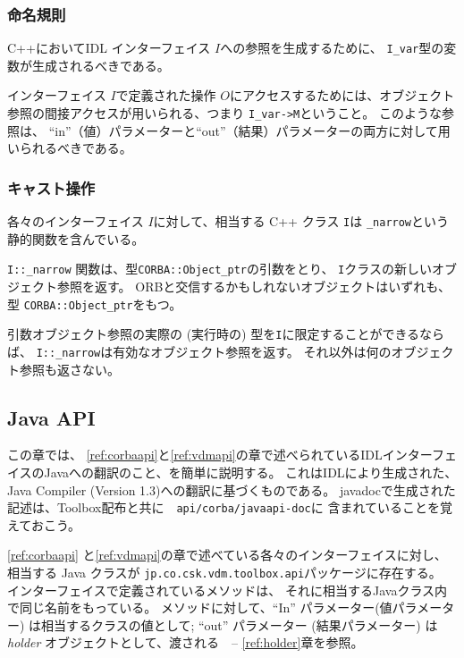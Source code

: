 \documentclass[\pformat,12pt]{jarticle}
\begin{document}
\subsubsection{命名規則}

C++においてIDL インターフェイス $I$への参照を生成するために、
 \texttt{I\_var}型の変数が生成されるべきである。

インターフェイス $I$で定義された操作 $O$にアクセスするためには、オブジェクト参照の間接アクセスが用いられる、つまり \texttt{I\_var->M}ということ。
このような参照は、 ``in''（値）パラメーターと``out''（結果）パラメーターの両方に対して用いられるべきである。

\subsubsection{キャスト操作}

各々のインターフェイス $I$に対して、相当する C++ クラス \texttt{I}は
\texttt{\_narrow}という静的関数を含んでいる。

 \texttt{I::\_narrow} 関数は、型\texttt{CORBA::Object\_ptr}の引数をとり、
 \texttt{I}クラスの新しいオブジェクト参照を返す。
ORBと交信するかもしれないオブジェクトはいずれも、
 型 \texttt{CORBA::Object\_ptr}をもつ。

引数オブジェクト参照の実際の (実行時の) 型を\texttt{I}に限定することができるならば、 \texttt{I::\_narrow}は有効なオブジェクト参照を返す。
それ以外は何のオブジェクト参照も返さない。


\subsection{Java API}

この章では、 \ref{ref:corbaapi}と\ref{ref:vdmapi}の章で述べられているIDLインターフェイスのJavaへの翻訳のこと、を簡単に説明する。
これはIDLにより生成された、
Java Compiler (Version 1.3)への翻訳に基づくものである。
javadocで生成された記述は、Toolbox配布と共に　\texttt{api/corba/javaapi-doc}に 含まれていることを覚えておこう。

 \ref{ref:corbaapi} と\ref{ref:vdmapi}の章で述べている各々のインターフェイスに対し、相当する Java クラスが \texttt{jp.co.csk.vdm.toolbox.api}パッケージに存在する。
インターフェイスで定義されているメソッドは、
それに相当するJavaクラス内で同じ名前をもっている。
メソッドに対して、``In'' パラメーター(値パラメーター) は相当するクラスの値として; ``out'' パラメーター (結果パラメーター) は \textit{holder} オブジェクトとして、渡される　--  \ref{ref:holder}章を参照。 
\end{document}
